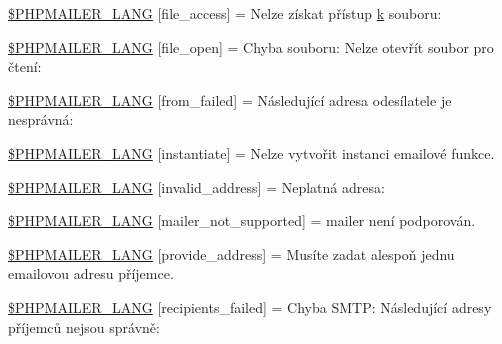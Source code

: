 \begin{DoxyCompactItemize}
\item 
\hyperlink{phpmailer_8lang-cz_8php_a7e83349023b856ef9e5c46e30ae6d51e}{\$\+P\+H\+P\+M\+A\+I\+L\+E\+R\+\_\+\+L\+A\+NG} \mbox{[}\textquotesingle{}file\+\_\+access\textquotesingle{}\mbox{]} = \textquotesingle{}Nelze získat přístup \hyperlink{_chart_8min_8js_ab26645c014aa005ecedef329ecf58c99}{k} souboru\+: \textquotesingle{}
\item 
\hyperlink{phpmailer_8lang-cz_8php_a28d1a6517bf4c942a0ddd506188ad2e0}{\$\+P\+H\+P\+M\+A\+I\+L\+E\+R\+\_\+\+L\+A\+NG} \mbox{[}\textquotesingle{}file\+\_\+open\textquotesingle{}\mbox{]} = \textquotesingle{}Chyba souboru\+: Nelze otevřít soubor pro čtení\+: \textquotesingle{}
\item 
\hyperlink{phpmailer_8lang-cz_8php_adf832ae12155a09be077c6d5e4fd7e22}{\$\+P\+H\+P\+M\+A\+I\+L\+E\+R\+\_\+\+L\+A\+NG} \mbox{[}\textquotesingle{}from\+\_\+failed\textquotesingle{}\mbox{]} = \textquotesingle{}Následující adresa odesílatele je nesprávná\+: \textquotesingle{}
\item 
\hyperlink{phpmailer_8lang-cz_8php_ad58dde16780f4770ccf4dd282ea1f5ad}{\$\+P\+H\+P\+M\+A\+I\+L\+E\+R\+\_\+\+L\+A\+NG} \mbox{[}\textquotesingle{}instantiate\textquotesingle{}\mbox{]} = \textquotesingle{}Nelze vytvořit instanci emailové funkce.\textquotesingle{}
\item 
\hyperlink{phpmailer_8lang-cz_8php_a42d61bcea4c79599ecb44fd062f54d47}{\$\+P\+H\+P\+M\+A\+I\+L\+E\+R\+\_\+\+L\+A\+NG} \mbox{[}\textquotesingle{}invalid\+\_\+address\textquotesingle{}\mbox{]} = \textquotesingle{}Neplatná adresa\+: \textquotesingle{}
\item 
\hyperlink{phpmailer_8lang-cz_8php_aa2ebcb8833ee83a7ad67401c4bb3a6ad}{\$\+P\+H\+P\+M\+A\+I\+L\+E\+R\+\_\+\+L\+A\+NG} \mbox{[}\textquotesingle{}mailer\+\_\+not\+\_\+supported\textquotesingle{}\mbox{]} = \textquotesingle{} mailer není podporován.\textquotesingle{}
\item 
\hyperlink{phpmailer_8lang-cz_8php_a8b97897c2406b7392b056f375feeefbb}{\$\+P\+H\+P\+M\+A\+I\+L\+E\+R\+\_\+\+L\+A\+NG} \mbox{[}\textquotesingle{}provide\+\_\+address\textquotesingle{}\mbox{]} = \textquotesingle{}Musíte zadat alespoň jednu emailovou adresu příjemce.\textquotesingle{}
\item 
\hyperlink{phpmailer_8lang-cz_8php_a7589d30bb9b368327c2df015f3e6bcba}{\$\+P\+H\+P\+M\+A\+I\+L\+E\+R\+\_\+\+L\+A\+NG} \mbox{[}\textquotesingle{}recipients\+\_\+failed\textquotesingle{}\mbox{]} = \textquotesingle{}Chyba S\+M\+T\+P\+: Následující adresy příjemců nejsou správně\+: \textquotesingle{}
\item 

\end{DoxyCompactItemize}
